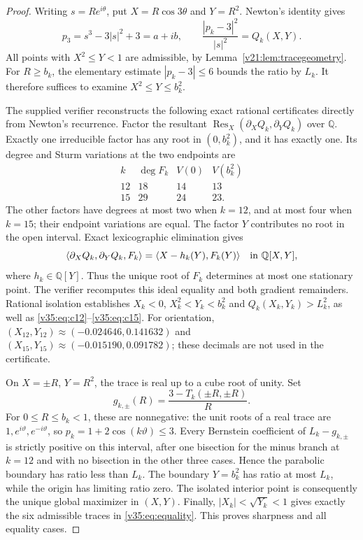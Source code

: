 \documentclass[UTF8,11pt]{ctexart}
\theoremstyle{definition}
\numberwithin{equation}{section}
\begin{document}
\begin{proof}
Writing $s=Re^{i\theta}$, put $X=R\cos3\theta$ and $Y=R^2$.
Newton's identity gives
\[
 p_3=s^3-3|s|^2+3=a+ib,\qquad
 \frac{|p_k-3|^2}{|s|^2}=Q_k(X,Y).
\]
All points with $X^2\le Y<1$ are admissible, by
Lemma~\ref{v21:lem:tracegeometry}. For $R\ge b_k$, the
elementary estimate $|p_k-3|\le6$ bounds the ratio by $L_k$.
It therefore suffices to examine $X^2\le Y\le b_k^2$.

The supplied verifier reconstructs the following exact rational
certificates directly from Newton's recurrence.
Factor the resultant
$\operatorname{Res}_X(\partial_XQ_k,\partial_YQ_k)$ over
$\mathbb Q$. Exactly one irreducible factor has any root in
$(0,b_k^2)$, and it has exactly one. Its degree and Sturm
variations at the two endpoints are
\[
\begin{array}{c|c|c|c}
 k&\deg F_k&V(0)&V(b_k^2)\\\hline
 12&18&14&13\\
 15&29&24&23.
\end{array}
\]
The other factors have degrees at most two when $k=12$,
and at most four when $k=15$; their endpoint variations
are equal. The factor $Y$ contributes no root in the open
interval. Exact lexicographic elimination gives
\[
 \langle\partial_XQ_k,\partial_YQ_k,F_k\rangle
       =\langle X-h_k(Y),F_k(Y)\rangle
       \quad\hbox{in }\mathbb Q[X,Y],
\]
where $h_k\in\mathbb Q[Y]$. Thus the unique root of $F_k$
determines at most one stationary point. The verifier
recomputes this ideal equality and both gradient remainders.
Rational isolation establishes $X_k<0$, $X_k^2<Y_k<b_k^2$
and $Q_k(X_k,Y_k)>L_k^2$, as well as
\eqref{v35:eq:c12}--\eqref{v35:eq:c15}.
For orientation, $(X_{12},Y_{12})\approx(-0.024646,0.141632)$
and $(X_{15},Y_{15})\approx(-0.015190,0.091782)$;
these decimals are not used in the certificate.

On $X=\pm R$, $Y=R^2$, the trace is real up to a cube root
of unity. Set
\[
 g_{k,\pm}(R)=\frac{3-T_k(\pm R,\pm R)}R.
\]
For $0\le R\le b_k<1$, these are nonnegative: the unit
roots of a real trace are $1,e^{i\vartheta},e^{-i\vartheta}$,
so $p_k=1+2\cos(k\vartheta)\le3$.
Every Bernstein coefficient of $L_k-g_{k,\pm}$ is strictly
positive on this interval, after one bisection for the minus
branch at $k=12$ and with no bisection in the other three cases.
Hence the parabolic boundary has ratio less than $L_k$.
The boundary $Y=b_k^2$ has ratio at most $L_k$, while the
origin has limiting ratio zero. The isolated interior point
is consequently the unique global maximizer in $(X,Y)$.
Finally, $|X_k|<\sqrt{Y_k}<1$ gives exactly the six admissible
traces in \eqref{v35:eq:equality}. This proves sharpness and
all equality cases.
\end{proof}
\end{document}
